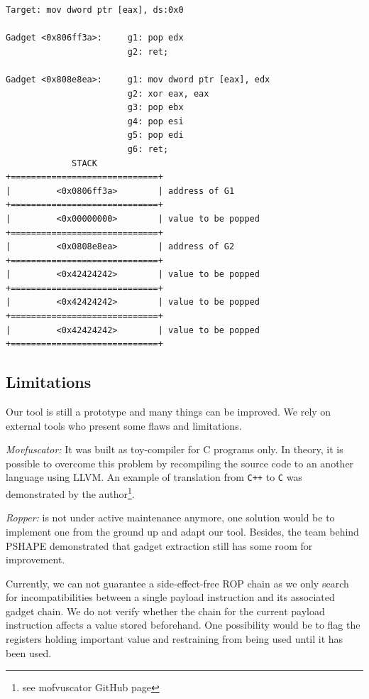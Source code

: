 \documentclass[10pt,twocolumn]{article}
\begin{document}
\begin{lstlisting}[float=h,aboveskip=\medskipamount,belowskip=-10pt,label=lst-stack,caption=
Stack preparation]
Target: mov dword ptr [eax], ds:0x0

Gadget <0x806ff3a>:     g1: pop edx
                        g2: ret;
                   
Gadget <0x808e8ea>:     g1: mov dword ptr [eax], edx
                        g2: xor eax, eax
                        g3: pop ebx
                        g4: pop esi
                        g5: pop edi
                        g6: ret;
             STACK
+=============================+
|         <0x0806ff3a>        | address of G1
+=============================+
|         <0x00000000>        | value to be popped
+=============================+
|         <0x0808e8ea>        | address of G2
+=============================+
|         <0x42424242>        | value to be popped
+=============================+
|         <0x42424242>        | value to be popped
+=============================+
|         <0x42424242>        | value to be popped
+=============================+
\end{lstlisting}


\subsection{Limitations}
Our tool is still a prototype and many things can be improved. We
rely on external tools who present some flaws and limitations.

\textit{Movfuscator:} It was built as toy-compiler for C programs only. In
theory, it is possible to overcome this problem by recompiling the source
code to an another language using LLVM. An example of translation from
\texttt{C++} to \texttt{C} was demonstrated by the author\footnote{see
mofvuscator GitHub page}.

\textit{Ropper:} is not under active maintenance anymore, one solution would be
to implement one from the ground up and adapt our tool. Besides, the team
behind PSHAPE demonstrated that gadget extraction still has some room for
improvement.

Currently, we can not guarantee a side-effect-free ROP chain as we only search
for incompatibilities between a single payload instruction and its associated
gadget chain. We do not verify whether the chain for the current
payload instruction affects a value stored beforehand. One possibility would be
to flag the registers holding important value and restraining from being used
until it has been used.
\end{document}
